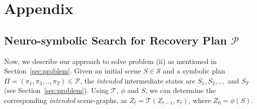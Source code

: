 \section{Appendix}
\label{ch:appendix}

\subsection{Neuro-symbolic Search for Recovery Plan $\mathcal{P}$}
\label{subsec:plan}
Now, we describe our approach to solve problem (ii) as mentioned in Section~\ref{sec:problem}. Given an initial scene $S \in \mathcal{S}$ and a symbolic plan $\Pi = (\pi_1, \pi_2, .., \pi_T) \in \mathcal{P}$, the \textit{intended} intermediate states are $S_1, S_2, ..,$ and $S_T$ (see Section~\ref{sec:problem}). Using $\mathcal{T}$, $\phi$ and $S$, we can determine the corresponding \textit{intended} scene-graphs, as $Z_t = \mathcal{T}(Z_{t-1}, \pi_t)$, where $Z_0 = \phi(S)$. 


